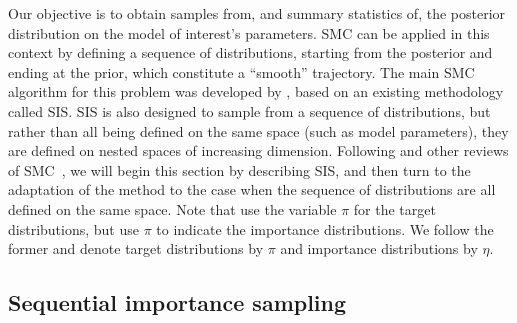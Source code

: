 Our objective is to obtain samples from, and summary statistics of, the
posterior distribution on the model of interest's parameters. \gls{SMC} can be
applied in this context by defining a sequence of distributions, starting from
the posterior and ending at the prior, which constitute a ``smooth''
trajectory. The main \gls{SMC} algorithm for this problem was developed by
\textcite{del2006sequential}, based on an existing methodology called
\gls{SIS}. \gls{SIS} is also designed to sample from a sequence of
distributions, but rather than all being defined on the same space (such as
model parameters), they are defined on nested spaces of increasing dimension.
Following \textcite{del2006sequential} and other reviews of
\gls{SMC}~\autocite{doucet2001introduction}, we will begin this section by
describing \gls{SIS}, and then turn to the adaptation of the method to the case
when the sequence of distributions are all defined on the same space. Note that
\textcite{del2006sequential} use the variable $\pi$ for the target
distributions, but \textcite{doucet2001introduction} use $\pi$ to indicate the
importance distributions. We follow the former and denote target distributions
by $\pi$ and importance distributions by $\eta$.

\subsection{Sequential importance sampling}

